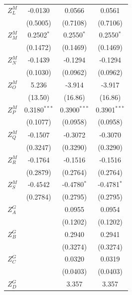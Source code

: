 \begin{tabular}{lccc}
   $Z^{M}_L$            & -0.0130        & 0.0566          & 0.0561\\   
                        & (0.5005)       & (0.7108)        & (0.7106)\\   
   $Z^{M}_M$            & 0.2502$^{*}$   & 0.2550$^{*}$    & 0.2550$^{*}$\\   
                        & (0.1472)       & (0.1469)        & (0.1469)\\   
   $Z^{M}_N$            & -0.1439        & -0.1294         & -0.1294\\   
                        & (0.1030)       & (0.0962)        & (0.0962)\\   
   $Z^{M}_O$            & 5.236          & -3.914          & -3.917\\   
                        & (13.50)        & (16.86)         & (16.86)\\   
   $Z^{M}_P$            & 0.3180$^{***}$ & 0.3900$^{***}$  & 0.3901$^{***}$\\   
                        & (0.1077)       & (0.0958)        & (0.0958)\\   
   $Z^{M}_Q$            & -0.1507        & -0.3072         & -0.3070\\   
                        & (0.3247)       & (0.3290)        & (0.3290)\\   
   $Z^{M}_R$            & -0.1764        & -0.1516         & -0.1516\\   
                        & (0.2879)       & (0.2764)        & (0.2764)\\   
   $Z^{M}_S$            & -0.4542        & -0.4780$^{*}$   & -0.4781$^{*}$\\   
                        & (0.2784)       & (0.2795)        & (0.2795)\\   
   $Z^{G}_A$            &                & 0.0955          & 0.0954\\   
                        &                & (0.1202)        & (0.1202)\\   
   $Z^{G}_B$            &                & 0.2940          & 0.2941\\   
                        &                & (0.3274)        & (0.3274)\\   
   $Z^{G}_C$            &                & 0.0320          & 0.0319\\   
                        &                & (0.0403)        & (0.0403)\\   
   $Z^{G}_D$            &                & 3.357           & 3.357\\   

\end{tabular}
